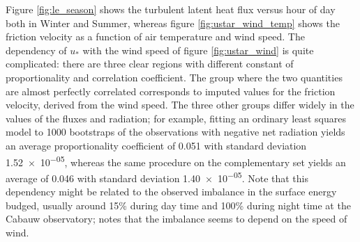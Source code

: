 \documentclass[a4paper]{book}
\begin{document}
Figure \ref{fig:le_season} shows the turbulent latent heat flux versus hour of day both in Winter and Summer, whereas figure \ref{fig:ustar_wind_temp} shows the friction velocity as a function of air temperature and wind speed. The dependency of $u_*$ with the wind speed of figure \ref{fig:ustar_wind} is quite complicated: there are three clear regions with different constant of proportionality and correlation coefficient. The group where the two quantities are almost perfectly correlated corresponds to imputed values for the friction velocity, derived from the wind speed. The three other groups differ widely in the values of the fluxes and radiation; for example, fitting an ordinary least squares model to 1000 bootstraps of the observations with negative net radiation yields an average proportionality coefficient of \num{0.051} with standard deviation \num{1.52e-05}, whereas the same procedure on the complementary set yields an average of \num{0.046} with standard deviation \num{1.40e-05}. Note that this dependency might be related to the observed imbalance in the surface energy budged, usually around 15\% during day time and 100\% during night time at the Cabauw observatory; \cite{cabauwinsitu} notes that the imbalance seems to depend on the speed of wind.
\end{document}

